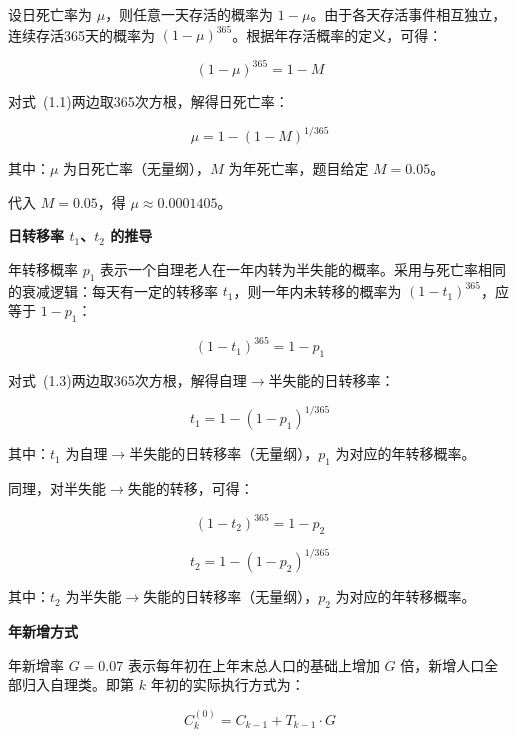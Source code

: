 \documentclass[12pt,a4paper]{article}
\begin{document}
设日死亡率为 $\mu$，则任意一天存活的概率为 $1-\mu$。由于各天存活事件相互独立，连续存活365天的概率为 $(1-\mu)^{365}$。根据年存活概率的定义，可得：

\begin{equation}
(1-\mu)^{365} = 1 - M
\tag{1.1}
\end{equation}

对式~(1.1)两边取365次方根，解得日死亡率：

\begin{equation}
\mu = 1 - (1 - M)^{1/365}
\tag{1.2}
\end{equation}

其中：$\mu$ 为日死亡率（无量纲），$M$ 为年死亡率，题目给定 $M=0.05$。

代入 $M=0.05$，得 $\mu \approx 0.0001405$。

\noindent\textbf{日转移率 $t_1$、$t_2$ 的推导}

年转移概率 $p_1$ 表示一个自理老人在一年内转为半失能的概率。采用与死亡率相同的衰减逻辑：每天有一定的转移率 $t_1$，则一年内未转移的概率为 $(1-t_1)^{365}$，应等于 $1-p_1$：

\begin{equation}
(1-t_1)^{365} = 1 - p_1
\tag{1.3}
\end{equation}

对式~(1.3)两边取365次方根，解得自理$\to$半失能的日转移率：

\begin{equation}
t_1 = 1 - (1 - p_1)^{1/365}
\tag{1.4}
\end{equation}

其中：$t_1$ 为自理$\to$半失能的日转移率（无量纲），$p_1$ 为对应的年转移概率。

同理，对半失能$\to$失能的转移，可得：

\begin{equation}
(1-t_2)^{365} = 1 - p_2
\tag{1.5}
\end{equation}

\begin{equation}
t_2 = 1 - (1 - p_2)^{1/365}
\tag{1.6}
\end{equation}

其中：$t_2$ 为半失能$\to$失能的日转移率（无量纲），$p_2$ 为对应的年转移概率。

\noindent\textbf{年新增方式}

年新增率 $G=0.07$ 表示每年初在上年末总人口的基础上增加 $G$ 倍，新增人口全部归入自理类。即第 $k$ 年初的实际执行方式为：

\begin{equation}
C_{k}^{(0)} = C_{k-1} + T_{k-1} \cdot G
\tag{1.7}
\end{equation}
\end{document}
